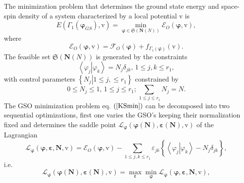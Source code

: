 \documentclass[aps,preprint]{revtex4}%
\begin{document}
The minimization problem that determines the ground state energy and
space-spin density of a system characterized by a local potential $\mathrm{v}$
is
\begin{equation}
E\left(  \Gamma_{1}\left(  \boldsymbol{\varphi}_{GS}\right)  \boldsymbol{,}%
\mathrm{v}\right)  =\min_{\boldsymbol{\varphi\in}\mathfrak{S}\left(
\boldsymbol{N}\left(  N\right)  \right)  }\mathcal{E}_{O}\left(
\boldsymbol{\varphi,}\mathrm{v}\right)  , \label{KSmin}%
\end{equation}
where
\begin{equation}
\mathcal{E}_{O}\left(  \boldsymbol{\varphi,}\mathrm{v}\right)  =\mathcal{F}%
_{O}\left(  \boldsymbol{\varphi}\right)  +f_{\Gamma_{1}\left(
\boldsymbol{\varphi}\right)  }\left(  \mathrm{v}\right)  .
\end{equation}
The feasible set $\mathfrak{S}\left(  \boldsymbol{N}\left(  N\right)  \right)
$ is generated by the constraints
\begin{equation}
\left\langle \left.  \varphi_{j}\right\vert \varphi_{k}\right\rangle
=N_{j}\delta_{jk},\,1\leq j,k\leq r_{1},
\end{equation}
with control parameters $\left\{  \left.  N_{j}\right\vert 1\leq j,\leq
r_{1}\right\}  $ constrained by
\begin{equation}
0\leq N_{j}\leq1,\,1\leq j\leq r_{1};\sum_{\,1\leq j\leq r_{1}}N_{j}=N.
\end{equation}
The GSO minimization problem eq. $\left(  \ref{KSmin}\right)  $ can be
decomposed into two sequential optimizations, first one varies the GSO's
keeping their normalization fixed and determines the saddle point
$\mathcal{L}_{\boldsymbol{\varphi}}\left(  \boldsymbol{\varphi}\left(
\boldsymbol{N}\right)  ,\boldsymbol{\varepsilon}\left(  \boldsymbol{N}\right)
,\mathrm{v}\right)  $ of the Lagrangian
\begin{equation}
\mathcal{L}_{\boldsymbol{\varphi}}\left(  \boldsymbol{\varphi}%
,\boldsymbol{\varepsilon,N,}\mathrm{v}\right)  =\mathcal{E}_{O}\left(
\boldsymbol{\varphi,}\mathrm{v}\right)  -\sum_{1\leq j,k\leq r_{1}}%
\varepsilon_{jk}\left\{  \overset{}{\left\langle \left.  \varphi
_{j}\right\vert \varphi_{k}\right\rangle -N_{j}\delta_{jk}}\right\}  ,
\end{equation}
i.e.
\begin{equation}
\mathcal{L}_{\boldsymbol{\varphi}}\left(  \boldsymbol{\varphi}\left(
\boldsymbol{N}\right)  ,\boldsymbol{\varepsilon}\left(  \boldsymbol{N}\right)
,\mathrm{v}\right)  =\max_{\boldsymbol{\varepsilon}}\min_{\boldsymbol{\varphi
}}\mathcal{L}_{\boldsymbol{\varphi}}\left(  \boldsymbol{\varphi}%
,\boldsymbol{\varepsilon,N,}\mathrm{v}\right)  , \label{KSM1}%
\end{equation}
\end{document}
